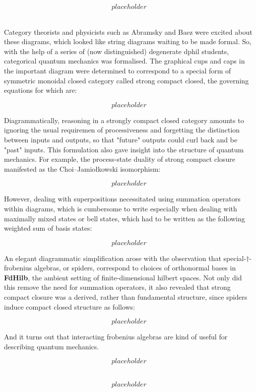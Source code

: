 \[placeholder\]

\\

Category theorists and physicists such as Abramsky and Baez were excited about these diagrams, which looked like string diagrams waiting to be made formal. So, with the help of a series of (now distinguished) degenerate dphil students, categorical quantum mechanics was formalised. The graphical cups and caps in the important diagram were determined to correspond to a special form of symmetric monoidal closed category called strong compact closed, the governing equations for which are:

\[placeholder\]

Diagrammatically, reasoning in a strongly compact closed category amounts to ignoring the usual requiremen of processiveness and forgetting the distinction between inputs and outputs, so that "future" outputs could curl back and be "past" inputs. This formulation also gave insight into the structure of quantum mechanics. For example, the process-state duality of strong compact closure manifested as the Choi–Jamiołkowski isomorphism:

\[placeholder\]

However, dealing with superpositions necessitated using summation operators within diagrams, which is cumbersome to write especially when dealing with maximally mixed states or bell states, which had to be written as the following weighted sum of basis states:

\[placeholder\]

An elegant diagrammatic simplification arose with the observation that special-$\dagger$-frobenius algebras, or spiders, correspond to choices of orthonormal bases \citep{} in \textbf{FdHilb}, the ambient setting of finite-dimensional hilbert spaces. Not only did this remove the need for summation operators, it also revealed that strong compact closure was a derived, rather than fundamental structure, since spiders induce compact closed structure as follows:

\[placeholder\]

And it turns out that interacting frobenius algebras are kind of useful for describing quantum mechanics.

\[placeholder\]

\\

\[placeholder\]

